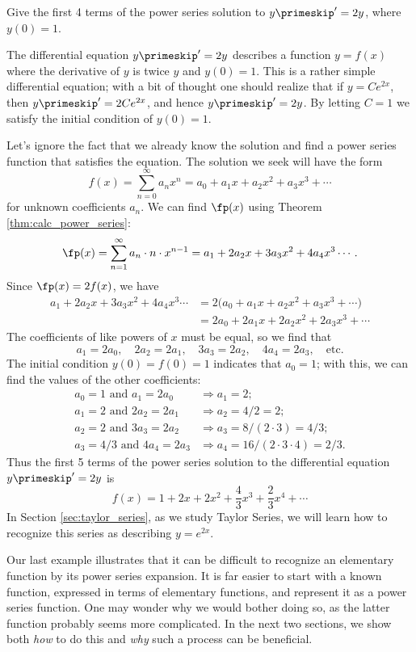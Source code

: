 {Give the first 4 terms of the power series solution to $y\primeskip' = 2y$, where $y(0) = 1$.
}
{The differential equation $y\primeskip' = 2y$ describes a function $y=f(x)$ where the derivative of $y$ is twice $y$ and $y(0)=1$. This is a rather simple differential equation; with a bit of thought one should realize that if $y=Ce^{2x}$, then $y\primeskip' = 2Ce^{2x}$, and hence $y\primeskip' = 2y$. By letting $C=1$ we satisfy the initial condition of $y(0)=1$.

Let's ignore the fact that we already know the solution and find a power series function that satisfies the equation. The solution we seek will have the form
$$f(x)  = \sum_{n=0}^\infty a_nx^n = a_0+a_1x+a_2x^2+a_3x^3+\cdots$$
for unknown coefficients $a_n$. We can find $\fp(x)$ using Theorem \ref{thm:calc_power_series}:
$$\fp(x) = \sum_{n=1}^\infty a_n\cdot n\cdot x^{n-1} = a_1+2a_2x+3a_3x^2+4a_4x^3\cdots.$$
Since $\fp(x) = 2f(x)$, we have
\begin{align*}
a_1+2a_2x+3a_3x^2+4a_4x^3\cdots &= 2\big(a_0+a_1x+a_2x^2+a_3x^3+\cdots\big)\\
			&=2a_0+2a_1x+2a_2x^2+2a_3x^3+\cdots
\end{align*}
The coefficients of like powers of $x$ must be equal, so we find that
$$a_1 = 2a_0,\quad 2a_2 = 2a_1,\quad 3a_3 = 2a_2,\quad 4a_4 = 2a_3,\quad \text{etc.}$$
The initial condition $y(0) = f(0) = 1$ indicates that $a_0 = 1$; with this, we can find the values of the other coefficients:
\begin{align*}
a_0 = 1 \text{ and } a_1=2a_0 &\Rightarrow a_1 = 2;\\
a_1 = 2 \text{ and } 2a_2 = 2a_1 &\Rightarrow a_2=4/2 =2;\\
a_2=2 \text{ and } 3a_3 = 2a_2 &\Rightarrow a_3=8/(2\cdot3)=4/3;\\
a_3=4/3 \text{ and } 4a_4 = 2a_3 &\Rightarrow a_4 =16/(2\cdot3\cdot4)= 2/3. 
\end{align*}
Thus the first 5 terms of the power series solution to the differential equation $y\primeskip'=2y$ is 
$$f(x) = 1+ 2x+2x^2 + \frac43x^3+\frac23x^4+\cdots$$
In Section \ref{sec:taylor_series}, as we study Taylor Series, we will learn how to recognize this series as describing $y=e^{2x}$.}

Our last example illustrates that it can be difficult to recognize an elementary function by its power series expansion. It is far easier to start with a known function, expressed in terms of elementary functions, and represent it as a power series function. One may wonder why we would bother doing so, as the latter function probably seems more complicated. In the next two sections, we show both \emph{how} to do this and  \emph{why} such a process can be beneficial. 

